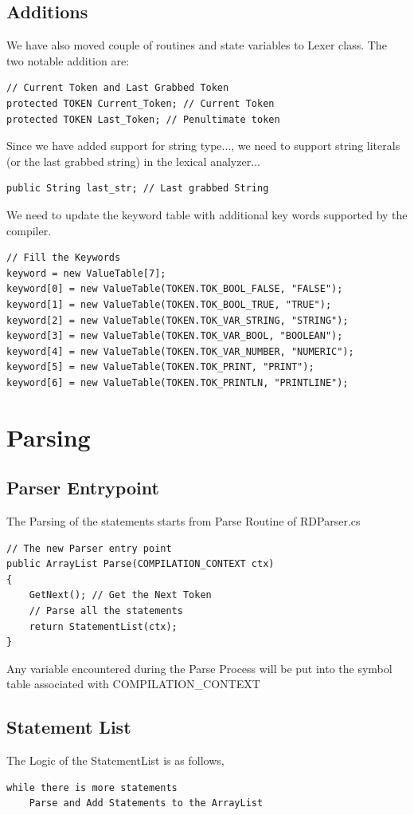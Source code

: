 \subsection{Additions}
We have also moved couple of routines and state variables to Lexer class. The two notable addition are:
\lstset{style=csharp}
\begin{lstlisting}
// Current Token and Last Grabbed Token
protected TOKEN Current_Token; // Current Token
protected TOKEN Last_Token; // Penultimate token
\end{lstlisting}
Since we have added support for string type..., we need to support string literals (or the last grabbed string) in the lexical analyzer...
\lstset{style=csharp}
\begin{lstlisting}
public String last_str; // Last grabbed String
\end{lstlisting}
We need to update the keyword table with additional key words supported by the compiler.
\lstset{style=csharp}
\begin{lstlisting}
// Fill the Keywords
keyword = new ValueTable[7];
keyword[0] = new ValueTable(TOKEN.TOK_BOOL_FALSE, "FALSE");
keyword[1] = new ValueTable(TOKEN.TOK_BOOL_TRUE, "TRUE");
keyword[2] = new ValueTable(TOKEN.TOK_VAR_STRING, "STRING");
keyword[3] = new ValueTable(TOKEN.TOK_VAR_BOOL, "BOOLEAN");
keyword[4] = new ValueTable(TOKEN.TOK_VAR_NUMBER, "NUMERIC");
keyword[5] = new ValueTable(TOKEN.TOK_PRINT, "PRINT");
keyword[6] = new ValueTable(TOKEN.TOK_PRINTLN, "PRINTLINE");
\end{lstlisting}
\section{Parsing}
\subsection{Parser Entrypoint}
The Parsing of the statements starts from Parse Routine of RDParser.cs
\lstset{style=csharp}
\begin{lstlisting}
// The new Parser entry point
public ArrayList Parse(COMPILATION_CONTEXT ctx)
{
	GetNext(); // Get the Next Token
	// Parse all the statements
	return StatementList(ctx);
}
\end{lstlisting}
Any variable encountered during the Parse Process will be put into the symbol table associated with COMPILATION\_CONTEXT
\subsection{Statement List}
The Logic of the StatementList is as follows,
\begin{verbatim}
while there is more statements
	Parse and Add Statements to the ArrayList
\end{verbatim}


